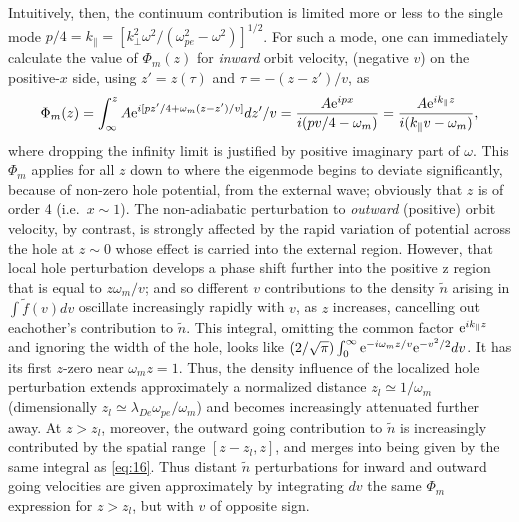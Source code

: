 \documentclass[12pt]{article}
\def\etothe#1{{\rm e}^{#1}}
\begin{document}
Intuitively, then, the continuum contribution is limited more or less
to the single mode
$p/4=k_\parallel= [k_\perp^2\omega^2/(\omega_{pe}^2-\omega^2)]^{1/2}$.
For such a mode, one can immediately calculate the value of
$\Phi_m(z)$ for \emph{inward} orbit velocity, (negative $v$) on the
positive-$x$ side, using $z'=z(\tau)$ and $\tau=-(z-z')/v$, as
\begin{equation}
  \label{eq:16}
  \Phi_m(z) = \int_{\infty}^zA{\rm e}^{i[pz'/4+\omega_m
    (z-z')/v]}dz'/v
  ={A{\rm e}^{ipx} \over i(pv/4-\omega_m)}={A{\rm e}^{ik_\parallel z} \over
    i(k_\parallel v-\omega_m)},
\end{equation}
where dropping the infinity limit is justified by positive imaginary
part of $\omega$.  This $\Phi_m$ applies for all $z$ down to where the
eigenmode begins to deviate significantly, because of non-zero hole
potential, from the external wave; obviously that $z$ is of order 4
(i.e.\ $x\sim 1$). The non-adiabatic perturbation to \emph{outward}
(positive) orbit velocity, by contrast, is strongly affected by the
rapid variation of potential across the hole at $z\sim 0$ whose effect
is carried into the external region. However,
that local hole perturbation develops a phase shift further into the
positive z region that is equal to $z\omega_m/v$; and so different $v$
contributions to the density $\tilde n$ arising in
$\int \tilde f(v) dv$ oscillate increasingly rapidly with $v$, as $z$
increases, cancelling out eachother's contribution to $\tilde n$. This
integral, omitting the common factor $\etothe{ik_\parallel z}$ and
ignoring the width of the hole, looks like
$(2/\sqrt{\pi})\int_0^\infty \etothe{-i\omega_m
  z/v}\etothe{-v^2/2}dv$.  It has its first $z$-zero near
$\omega_m z=1$. Thus, the density influence of the localized hole
perturbation extends approximately a normalized distance
$z_l\simeq 1/\omega_m$ (dimensionally
$z_l\simeq \lambda_{De}\omega_{pe}/\omega_m$) and becomes increasingly
attenuated further away. At $z>z_l$, moreover, the outward going
contribution to $\tilde n$ is increasingly contributed by the spatial
range $[z-z_l,z]$, and merges into being given by the same integral as
\ref{eq:16}.  Thus distant $\tilde n$ perturbations for inward and outward
going velocities are given approximately by integrating $dv$ the
same $\Phi_m$ expression for $z>z_l$, but with $v$ of opposite sign.
\end{document}
